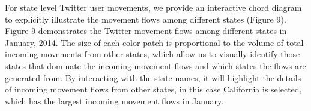 \documentclass[a4paper, 11pt]{article}
\begin{document}
%
%

For state level Twitter user movements, we provide an interactive chord diagram to explicitly illustrate the movement flows among different states (Figure 9). Figure 9 demonstrates the Twitter movement flows among different states in January, 2014. The size of each color patch is proportional to the volume of total incoming movements from other states, which allow us to visually identify those states that dominate the incoming movement flows and which states the flows are generated from.
By interacting with the state names, it will highlight the details of incoming movement flows from other states, in this case California is selected, which has the largest incoming movement flows in January.\newline
\end{document}
